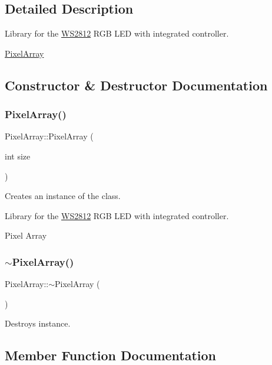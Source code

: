 \subsection{Detailed Description}
Library for the \hyperlink{class_w_s2812}{W\+S2812} R\+GB L\+ED with integrated controller. 

\hyperlink{class_pixel_array}{Pixel\+Array} 

\subsection{Constructor \& Destructor Documentation}
\mbox{\label{class_pixel_array_a86359f5eda90e0d12e3aa2c102ade21d}} 
\subsubsection{\texorpdfstring{Pixel\+Array()}{PixelArray()}}
{\footnotesize\ttfamily Pixel\+Array\+::\+Pixel\+Array (\begin{DoxyParamCaption}\item[{int}]{size }\end{DoxyParamCaption})}



Creates an instance of the class. 

Library for the \hyperlink{class_w_s2812}{W\+S2812} R\+GB L\+ED with integrated controller.

Pixel Array \mbox{\label{class_pixel_array_a9f4d10fcbd08290dfdecafb2ed4ad687}} 
\subsubsection{\texorpdfstring{$\sim$\+Pixel\+Array()}{~PixelArray()}}
{\footnotesize\ttfamily Pixel\+Array\+::$\sim$\+Pixel\+Array (\begin{DoxyParamCaption}{ }\end{DoxyParamCaption})}

Destroys instance. 

\subsection{Member Function Documentation}
\mbox{\label{class_pixel_array_a987f1dc053a5cf25d78d5cfe037088d3}} 
